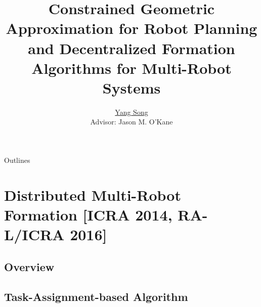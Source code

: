 \documentclass[10pt]{beamer}
\title[Ph.D. Defense]{Constrained Geometric Approximation for Robot Planning and  Decentralized Formation Algorithms for Multi-Robot Systems}
\author[Yang Song]{
  \underline{Yang Song}\\
  Advisor: Jason M. O'Kane
}
\institute[
USC
] %
{ %
  Dept. of Computer Science and Engineering\\
  University of South Carolina
  
}
\begin{document}
\begin{frame}
  \titlepage
\end{frame}
\begin{frame}{Outlines}{}
\tableofcontents
\end{frame}


\section{Distributed Multi-Robot Formation [ICRA 2014, RA-L/ICRA 2016]}
\subsection[Overview]{Overview}

















\subsection[Lattice Formation]{Task-Assignment-based Algorithm}







\end{document}
